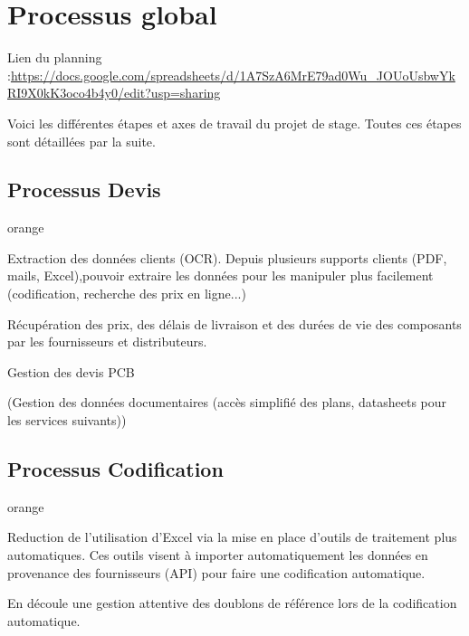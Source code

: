 

\chapter{Processus global}


Lien du planning  :\url{https://docs.google.com/spreadsheets/d/1A7SzA6MrE79ad0Wu_JOUoUsbwYkRI9X0kK3oco4b4y0/edit?usp=sharing}

Voici les différentes étapes et axes de travail du projet de stage. Toutes ces étapes sont détaillées par la suite.

\section{Processus Devis}

\begin{items}{orange}{\Bullet}

\item Extraction des données clients (OCR). 
Depuis plusieurs supports clients (PDF, mails, Excel),pouvoir extraire les données pour les manipuler plus facilement (codification, recherche des prix en ligne...)

\item Récupération des prix, des délais de livraison et des durées de vie des composants par les fournisseurs et distributeurs.

\item Gestion des devis PCB

\item (Gestion des données documentaires (accès simplifié des plans, datasheets pour les services suivants))

\end{items}


\section{Processus Codification}

\begin{items}{orange}{\Bullet}

\item Reduction de l’utilisation d’Excel via la mise en place d’outils de traitement plus automatiques. Ces outils visent à importer automatiquement les données en provenance des fournisseurs (API) pour faire une codification automatique.

\item En découle une gestion attentive des doublons de référence lors de la codification automatique.

\end{items}

